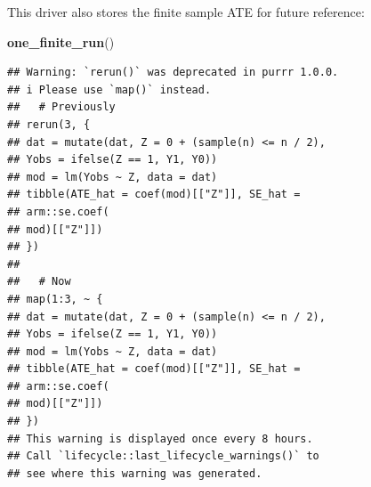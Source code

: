 \documentclass[
]{book}
\newenvironment{Shaded}{\begin{snugshade}}{\end{snugshade}}
\newcommand{\AttributeTok}[1]{\textcolor[rgb]{0.13,0.29,0.53}{#1}}
\newcommand{\ControlFlowTok}[1]{\textcolor[rgb]{0.13,0.29,0.53}{\textbf{#1}}}
\newcommand{\DecValTok}[1]{\textcolor[rgb]{0.00,0.00,0.81}{#1}}
\newcommand{\FunctionTok}[1]{\textcolor[rgb]{0.13,0.29,0.53}{\textbf{#1}}}
\newcommand{\NormalTok}[1]{#1}
\newcommand{\OtherTok}[1]{\textcolor[rgb]{0.56,0.35,0.01}{#1}}
\newcommand{\SpecialCharTok}[1]{\textcolor[rgb]{0.81,0.36,0.00}{\textbf{#1}}}
\newcommand{\StringTok}[1]{\textcolor[rgb]{0.31,0.60,0.02}{#1}}
\begin{document}
\begin{Shaded}
\end{Shaded}

This driver also stores the finite sample ATE for future reference:

\begin{Shaded}
\begin{Highlighting}[]
\FunctionTok{one\_finite\_run}\NormalTok{()}
\end{Highlighting}
\end{Shaded}

\begin{verbatim}
## Warning: `rerun()` was deprecated in purrr 1.0.0.
## i Please use `map()` instead.
##   # Previously
## rerun(3, {
## dat = mutate(dat, Z = 0 + (sample(n) <= n / 2),
## Yobs = ifelse(Z == 1, Y1, Y0))
## mod = lm(Yobs ~ Z, data = dat)
## tibble(ATE_hat = coef(mod)[["Z"]], SE_hat =
## arm::se.coef(
## mod)[["Z"]])
## })
## 
##   # Now
## map(1:3, ~ {
## dat = mutate(dat, Z = 0 + (sample(n) <= n / 2),
## Yobs = ifelse(Z == 1, Y1, Y0))
## mod = lm(Yobs ~ Z, data = dat)
## tibble(ATE_hat = coef(mod)[["Z"]], SE_hat =
## arm::se.coef(
## mod)[["Z"]])
## })
## This warning is displayed once every 8 hours.
## Call `lifecycle::last_lifecycle_warnings()` to
## see where this warning was generated.
\end{verbatim}
\end{document}
